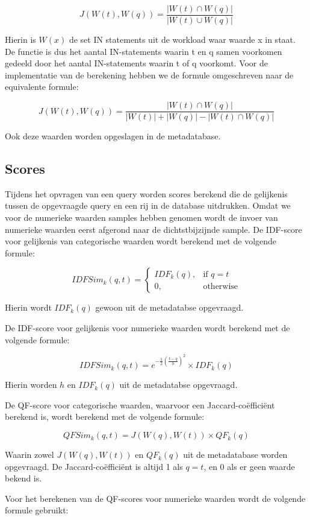 \documentclass[a4paper,oneside]{article}
\begin{document}
$$J\left(W(t), W(q)\right) = \frac{|W(t)\cap W(q)|}{|W(t)\cup W(q)|}$$

\noindent
Hierin is $W(x)$ de set IN statements uit de workload waar waarde x in staat. De functie is dus het aantal IN-statements waarin t en q samen voorkomen gedeeld door het aantal IN-statements waarin t of q voorkomt. Voor de implementatie van de berekening hebben we de formule omgeschreven naar de equivalente formule:

$$J\left(W(t), W(q)\right) = \frac{|W(t)\cap W(q)|}{|W(t)|+|W(q)|-|W(t)\cap W(q)|}$$

\noindent
Ook deze waarden worden opgeslagen in de metadatabase.


\subsection{Scores}
Tijdens het opvragen van een query worden scores berekend die de gelijkenis tussen de opgevraagde query en een rij in de database uitdrukken. Omdat we voor de numerieke waarden samples hebben genomen wordt de invoer van numerieke waarden eerst afgerond naar de dichtstbijzijnde sample. De IDF-score voor gelijkenis van categorische waarden wordt berekend met de volgende formule: 

$$IDFSim_k(q, t) = \begin{cases}IDF_k(q),& \text{if } q = t\\0,& \text{otherwise}\end{cases}$$

\noindent
Hierin wordt $IDF_k(q)$ gewoon uit de metadatabse opgevraagd.

De IDF-score voor gelijkenis  voor numerieke waarden wordt berekend met de volgende formule:

$$IDFSim_k(q, t) = e^{-\frac{1}{2}\left(\frac{t-q}{h}\right)^2}\times IDF_k(q)$$

\noindent
Hierin worden $h$ en $IDF_k(q)$ uit de metadatabse opgevraagd.

De QF-score voor categorische waarden, waarvoor een Jaccard-co\"effici\"ent berekend is, wordt berekend met de volgende formule:

$$QFSim_k(q, t) = J(W(q), W(t)) \times QF_k(q)$$

\noindent
Waarin zowel $J(W(q),W(t))$ en $QF_k(q)$ uit de metadatabase worden opgevraagd. De Jaccard-co\"effici\"ent is altijd 1 als $q = t$, en 0 als er geen waarde bekend is.

Voor het berekenen van de QF-scores voor numerieke waarden wordt de volgende formule gebruikt:
\end{document}
